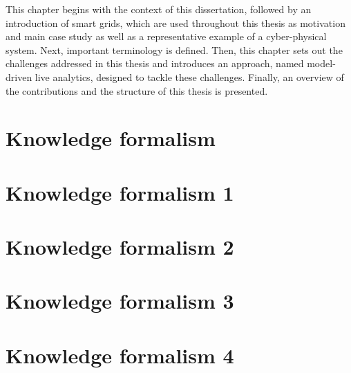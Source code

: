 {
	This chapter begins with the context of this dissertation, followed by an introduction of smart grids, which are used throughout this thesis  as motivation and main case study as well as a representative example of a cyber-physical system.
	Next, important terminology is defined.
	Then, this chapter sets out the challenges addressed in this thesis and introduces an approach, named model-driven live analytics, designed to tackle these challenges.
	Finally, an overview of the contributions and the structure of this thesis is presented.
}

\section{Knowledge formalism}
\section{Knowledge formalism 1}
\section{Knowledge formalism 2}
\section{Knowledge formalism 3}
\section{Knowledge formalism 4}